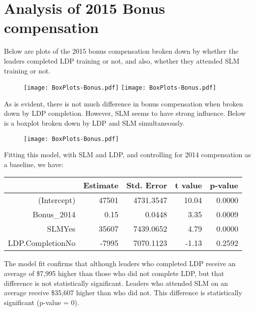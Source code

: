 \documentclass[11pt]{extarticle} %
\begin{document}
\section*{Analysis of 2015 Bonus compensation}
Below are plots of the 2015 bonus compensation broken down by whether the leaders completed LDP training or not, and also, whether they attended SLM training or not.
\begin{figure}[H]
\centering 
\texttt{[image: BoxPlots-Bonus.pdf]}
\texttt{[image: BoxPlots-Bonus.pdf]}
\end{figure}
As is evident, there is not much difference in bonus compensation when broken down by LDP completion. However, SLM seems to have strong influence. Below is a boxplot broken down by LDP and SLM simultaneously.
\begin{figure}[H]
\centering 
\texttt{[image: BoxPlots-Bonus.pdf]}
\end{figure}
Fitting this model, with SLM and LDP, and controlling for 2014 compensation as a baseline, we have:
\begin{table}[H]
\centering
\begin{tabular}{rrrrr}
  \hline
 & Estimate & Std. Error & t value & p-value \\ 
  \hline
  (Intercept) & 47501 & 4731.3547 & 10.04 & 0.0000 \\ 
  Bonus\_2014 & 0.15 & 0.0448 & 3.35 & 0.0009 \\ 
  SLMYes & 35607 & 7439.0652 & 4.79 & 0.0000 \\ 
  LDP.CompletionNo & -7995 & 7070.1123 & -1.13 & 0.2592 \\ 
  \hline
\end{tabular}
\end{table}
The model fit confirms that although leaders who completed LDP receive an average of \$7,995 higher than those who did not complete LDP, but that difference is not statistically significant. Leaders who attended SLM on an average receive \$35,607 higher than who did not. This difference is statistically significant (p-value = 0).
\end{document}
